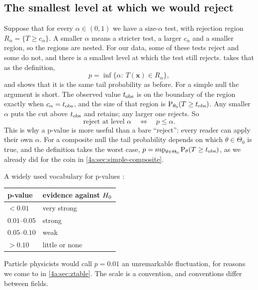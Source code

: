 \subsection{The smallest level at which we would reject}
\label{4a:sec:inf-alpha}

Suppose that for every $\alpha\in(0,1)$ we have a size-$\alpha$ test, with
rejection region $R_\alpha=\{T\ge c_\alpha\}$. A smaller $\alpha$ means a
stricter test, a larger $c_\alpha$ and a smaller region, so the regions are
nested. For our data, some of these tests reject and some do not, and there
is a smallest level at which the test still rejects. 
takes that as the definition,
\[
  p=\inf\bigl\{\alpha:\ T(\bm x)\in R_\alpha\bigr\},
\]
and  shows that it is the same tail probability as before.
For a simple null the argument is short. The observed value $t_{\rm obs}$ is on
the boundary of the region exactly when $c_\alpha=t_{\rm obs}$, and the size of
that region is $\operatorname{P}_{\theta_0}(T\ge t_{\rm obs})$. Any smaller $\alpha$ puts
the cut above $t_{\rm obs}$ and retains; any larger one rejects. So
\begin{equation}
  \text{reject at level }\alpha
  \quad\Longleftrightarrow\quad
  p\le\alpha .
  \label{4a:eq:p-le-alpha}
\end{equation}
This is why a p-value is more useful than a bare ``reject'': every reader can
apply their own $\alpha$. For a composite null the tail probability depends
on which $\theta\in\Theta_0$ is true, and the definition takes the worst case,
$p=\sup_{\theta\in\Theta_0}\operatorname{P}_\theta(T\ge t_{\rm obs})$, as we already did
for the coin in \cref{4a:sec:simple-composite}.

A widely used vocabulary for p-values :
\begin{center}
\begin{tabular}{ll}
\toprule
p-value & evidence against $H_0$ \\
\midrule
$<0.01$ & very strong \\
$0.01$--$0.05$ & strong \\
$0.05$--$0.10$ & weak \\
$>0.10$ & little or none \\
\bottomrule
\end{tabular}
\end{center}
Particle physicists would call $p=0.01$ an unremarkable fluctuation, for
reasons we come to in \cref{4a:sec:ztable}. The scale is a convention, and
conventions differ between fields.

